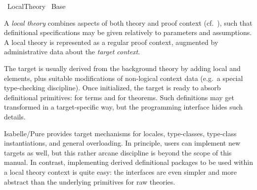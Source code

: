 %
\begin{isabellebody}%
\def\isabellecontext{Local{\isaliteral{5F}{\isacharunderscore}}Theory}%
%
\isadelimtheory
%
\endisadelimtheory
%
\isatagtheory
{}\isamarkupfalse%
\ Local{}Theory\isanewline
{}\ Base\isanewline
{}%
\endisatagtheory
{\isafoldtheory}%
%
\isadelimtheory
%
\endisadelimtheory
%
\isamarkuptrue%
%
\begin{isamarkuptext}%
A \emph{local theory} combines aspects of both theory and proof
  context (cf.\ ), such that definitional
  specifications may be given relatively to parameters and
  assumptions.  A local theory is represented as a regular proof
  context, augmented by administrative data about the \emph{target
  context}.

  The target is usually derived from the background theory by adding
  local  and  elements, plus
  suitable modifications of non-logical context data (e.g.\ a special
  type-checking discipline).  Once initialized, the target is ready to
  absorb definitional primitives:  for terms and
   for theorems.  Such definitions may get
  transformed in a target-specific way, but the programming interface
  hides such details.

  Isabelle/Pure provides target mechanisms for locales, type-classes,
  type-class instantiations, and general overloading.  In principle,
  users can implement new targets as well, but this rather arcane
  discipline is beyond the scope of this manual.  In contrast,
  implementing derived definitional packages to be used within a local
  theory context is quite easy: the interfaces are even simpler and
  more abstract than the underlying primitives for raw theories.


\end{isamarkuptext}
\end{isabellebody}
